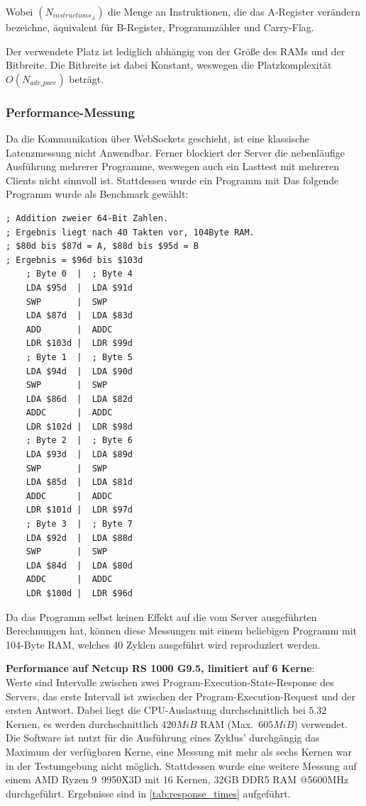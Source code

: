 Wobei $(N_{instructions_A})$ die Menge an Instruktionen, die das A-Register verändern bezeichne,
äquivalent für B-Register, Programmzähler und Carry-Flag.

Der verwendete Platz ist lediglich abhängig von der Größe des RAMs und der Bitbreite.
Die Bitbreite ist dabei Konstant, weswegen die Platzkomplexität ${O}(N_{adr_space})$ beträgt.

\subsubsection{Performance-Messung}
Da die Kommunikation über WebSockets geschieht, ist eine klassische Latenzmessung nicht Anwendbar.
Ferner blockiert der Server die nebenläufige Ausführung mehrerer Programme,
weswegen auch ein Lasttest mit mehreren Clients nicht sinnvoll ist.
Stattdessen wurde ein Programm mit
Das folgende Programm wurde als Benchmark gewählt:
\begin{lstlisting}[label={lst:lstlisting}]
; Addition zweier 64-Bit Zahlen.
; Ergebnis liegt nach 40 Takten vor, 104Byte RAM.
; $80d bis $87d = A, $88d bis $95d = B
; Ergebnis = $96d bis $103d
    ; Byte 0  |  ; Byte 4
    LDA $95d  |  LDA $91d
    SWP       |  SWP
    LDA $87d  |  LDA $83d
    ADD       |  ADDC
    LDR $103d |  LDR $99d
    ; Byte 1  |  ; Byte 5
    LDA $94d  |  LDA $90d
    SWP       |  SWP
    LDA $86d  |  LDA $82d
    ADDC      |  ADDC
    LDR $102d |  LDR $98d
    ; Byte 2  |  ; Byte 6
    LDA $93d  |  LDA $89d
    SWP       |  SWP
    LDA $85d  |  LDA $81d
    ADDC      |  ADDC
    LDR $101d |  LDR $97d
    ; Byte 3  |  ; Byte 7
    LDA $92d  |  LDA $88d
    SWP       |  SWP
    LDA $84d  |  LDA $80d
    ADDC      |  ADDC
    LDR $100d |  LDR $96d
\end{lstlisting}
Da das Programm selbst keinen Effekt auf die vom Server ausgeführten Berechnungen hat,
können diese Messungen mit einem beliebigen Programm mit 104-Byte RAM,
welches 40 Zyklen ausgeführt wird reproduziert werden.

\textbf{Performance auf Netcup RS 1000 G9.5, limitiert auf 6 Kerne}:\\
Werte sind Intervalle zwischen zwei Program-Execution-State-Response des Servers,
das erste Intervall ist zwischen der Program-Execution-Request und der ersten Antwort.
Dabei liegt die CPU-Auslastung durchschnittlich bei $5.32$ Kernen, es werden durchschnittlich $420MiB$ RAM (Max.\ $605MiB$) verwendet.
Die Software ist nutzt für die Ausführung eines Zyklus' durchgängig das Maximum der verfügbaren Kerne,
eine Messung mit mehr als sechs Kernen war in der Testumgebung nicht möglich.
Stattdessen wurde eine weitere Messung auf einem AMD Ryzen 9\ 9950X3D mit 16 Kernen, 32GB DDR5 RAM @5600MHz durchgeführt.
Ergebnisse sind in \autoref{tab:response_times} aufgeführt.

